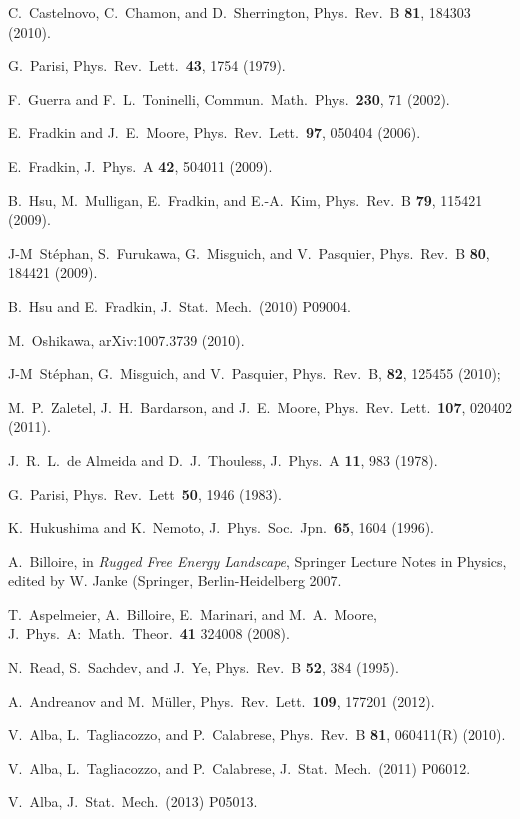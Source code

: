 \documentclass[twocolumn,superscriptaddress,prb,10pt]{revtex4-1}
\begin{document}
\begin{thebibliography}{99}
C.~Castelnovo, C.~Chamon, and D.~Sherrington, Phys.\ Rev.\ B {\bf 81}, 184303 (2010).

G.~Parisi, Phys.\ Rev.\ Lett.\ {\bf 43}, 1754 (1979).

F.~Guerra and F.~L.~Toninelli, Commun.\ Math.\ Phys.\ {\bf 230}, 71 (2002). 

E.~Fradkin and J.~E.~Moore, Phys.\ Rev.\ Lett.\ {\bf 97}, 050404 (2006). 

E.~Fradkin, J.\ Phys.\  A {\bf 42}, 504011 (2009). 

B.~Hsu, M.~Mulligan, E.~Fradkin, and E.-A.~Kim, Phys.\ Rev.\ B {\bf 79}, 115421 (2009).

J-M~St\'ephan, S.~Furukawa, G.~Misguich, and V.~Pasquier, Phys.\ Rev.\ B {\bf 80}, 
184421 (2009).

B.~Hsu and E.~Fradkin, J.\ Stat.\ Mech.\  (2010) P09004. 

M.~Oshikawa, arXiv:1007.3739 (2010).

J-M~St\'ephan, G.~Misguich, and V.~Pasquier, Phys.\ Rev.\ B, {\bf 82}, 125455 
(2010); 

M.~P.~Zaletel, J.~H.~Bardarson, and J.~E.~Moore, Phys.\ Rev.\ Lett.\ {\bf 107}, 
020402 (2011).

J.~R.~L.~de Almeida and D.~J.~Thouless, J.\ Phys.\ A {\bf 11}, 983 (1978). 

G.~Parisi, Phys.\ Rev.\ Lett\ {\bf 50}, 1946 (1983). 

K.~Hukushima and K.~Nemoto, J.\ Phys.\ Soc.\ Jpn.\ {\bf 65}, 1604 (1996).

A.~Billoire, in \emph{Rugged Free Energy Landscape}, Springer Lecture 
Notes in Physics, edited by W. Janke (Springer, Berlin-Heidelberg 
2007. 

T.~Aspelmeier, A.~Billoire, E.~Marinari, and M.~A.~Moore, 
J.\ Phys.\ A:\ Math.\ Theor.\ {\bf 41} 324008 (2008). 

N.~Read, S.~Sachdev, and J.~Ye, Phys.\ Rev.\ B {\bf 52}, 384 (1995). 

A.~Andreanov and M.~M\"uller, Phys.\ Rev.\ Lett.\ {\bf 109}, 177201 (2012). 

V.~Alba, L.~Tagliacozzo, and P.~Calabrese, Phys.\ Rev.\ B {\bf 81}, 060411(R) (2010).

V.~Alba, L.~Tagliacozzo, and P.~Calabrese, J.\ Stat.\ Mech.\ (2011) P06012. 

V.~Alba, J.\ Stat.\ Mech.\ (2013) P05013. 



\end{thebibliography}
\end{document}
